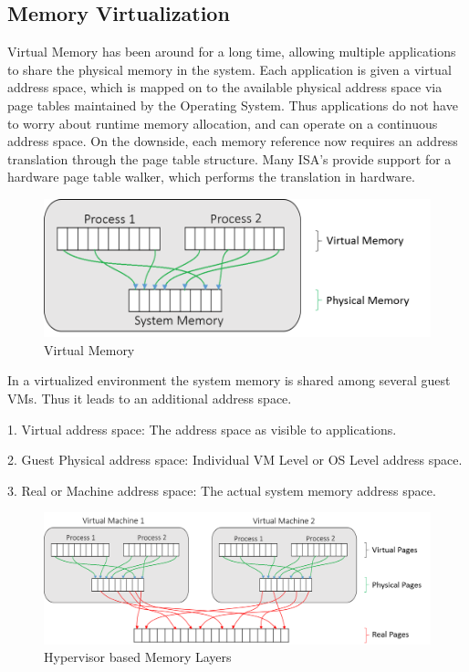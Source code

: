 \subsection{Memory Virtualization}
Virtual Memory has been around for a long time, allowing multiple applications to share the physical memory in the system. Each application is given a virtual address space, which is mapped on to the available physical address space via page tables maintained by the Operating System. Thus applications do not have to worry about runtime memory allocation, and can operate on a continuous address space. On the downside, each memory reference now requires an address translation through the page table structure. Many ISA’s provide support for a hardware page table walker, which performs the translation in hardware. 

\setlength{\belowcaptionskip}{-10pt}

\begin{figure}[H]
  \centering
  \includegraphics[scale=0.8]{figures/virt_mem.png}
  \caption{Virtual Memory}
  \label{fig:virt_mem}
\end{figure}
In a virtualized environment the system memory is shared among several guest VMs. Thus it leads to an additional address space.

1. Virtual address space: The address space as visible to applications.

2. Guest Physical address space: Individual VM Level or OS Level address space.

3. Real or Machine address space: The actual system memory address space.

\setlength{\belowcaptionskip}{-10pt}

\begin{figure}[H]
  \centering
  \includegraphics[scale=0.65]{figures/hyp_mem_map_comp.png}
  \caption{Hypervisor based Memory Layers}
  \label{fig:hyper_mem}
\end{figure}

